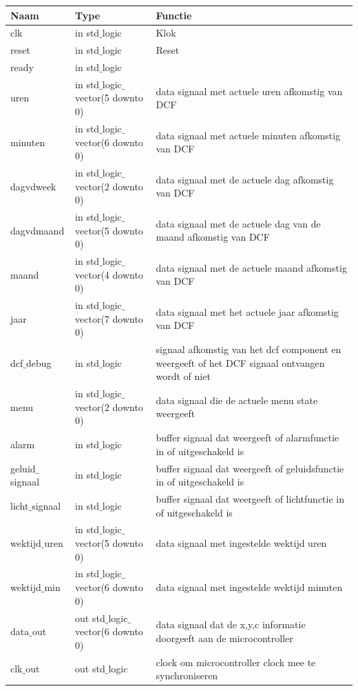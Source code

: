 \begin{center}
\label{table:uitgangen}
\begin{tabular}{| l | l | p{4.5cm} |}
\hline
\textbf{Naam} & \textbf{Type} & \textbf{Functie} \\ \hline
clk           				& in std$\_$logic           									& Klok             \\ \hline
reset         			& in std$\_$logic           									& Reset            \\ \hline
ready					& in std$\_$logic 											&  \\ \hline
uren						&in std$\_$logic$\_$vector(5 downto 0) 		&data signaal met actuele uren afkomstig van DCF \\ \hline
minuten				&in std$\_$logic$\_$vector(6 downto 0) 		&data signaal met actuele minuten afkomstig van DCF \\ \hline
dagvdweek			&in std$\_$logic$\_$vector(2 downto 0)			&data signaal met de actuele dag afkomstig van DCF\\ \hline
dagvdmaand		&in std$\_$logic$\_$vector(5 downto 0) 		&data signaal met de actuele dag van de maand afkomstig van DCF \\ \hline
maand					&in std$\_$logic$\_$vector(4 downto 0) 		&data signaal met de actuele maand afkomstig van DCF  \\ \hline
jaar						&in std$\_$logic$\_$vector(7 downto 0)	 		&data signaal met het actuele jaar afkomstig van DCF  \\ \hline
dcf$\_$debug		&in std$\_$logic 												&signaal afkomstig van het dcf component en weergeeft of het DCF signaal ontvangen wordt of niet \\ \hline
menu					&in std$\_$logic$\_$vector(2 downto 0)			&data signaal die de actuele menu state weergeeft \\ \hline
alarm 					&in std$\_$logic												&buffer signaal dat weergeeft of alarmfunctie in of uitgeschakeld is\\ \hline
geluid$\_$signaal 		&in std$\_$logic 		 										&buffer signaal dat weergeeft of geluidsfunctie in of uitgeschakeld is \\ \hline
licht$\_$signaal 	&in std$\_$logic 		 										&buffer signaal dat weergeeft of lichtfunctie in of uitgeschakeld is  \\ \hline 
wektijd$\_$uren 	& in std$\_$logic$\_$vector(5 downto 0)		&data signaal met ingestelde wektijd uren \\ \hline 
wektijd$\_$min 	&in std$\_$logic$\_$vector(6 downto 0) 		&data signaal met ingestelde wektijd minuten \\ \hline 
data$\_$out 		&out std$\_$logic$\_$vector(6 downto 0) 		&data signaal dat de x,y,c informatie doorgeeft aan de microcontroller \\ \hline 
clk$\_$out 			&out std$\_$logic 		 										&clock om microcontroller clock mee te synchroniseren \\ \hline 
\end{tabular}
\end{center}


